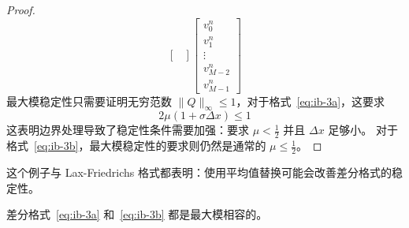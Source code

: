 \begin{proof}
\[\begin{bmatrix}
        \end{bmatrix}
        \begin{bmatrix}
            v_0^{n} \\ v_1^{n} \\ \vdots \\ v_{M-2}^{n} \\ v_{M-1}^{n}
        \end{bmatrix}
    \]
    最大模稳定性只需要证明无穷范数 $\|Q\|_{\infty} \le 1$，对于格式~\eqref{eq:ib-3a}，这要求
    \[
        2 \mu (1 + \sigma \Delta x) \le 1
    \]
    这表明边界处理导致了稳定性条件需要加强：要求 $\mu < \frac12$ 并且 $\Delta x $ 足够小。
    对于格式~\eqref{eq:ib-3b}，最大模稳定性的要求则仍然是通常的 $\mu \le \frac12$。
\end{proof}

\begin{remark}
    这个例子与 Lax-Friedrichs 格式都表明：使用平均值替换可能会改善差分格式的稳定性。
\end{remark}


\begin{example}
    差分格式~\eqref{eq:ib-3a} 和~\eqref{eq:ib-3b} 都是最大模相容的。
\end{example}

